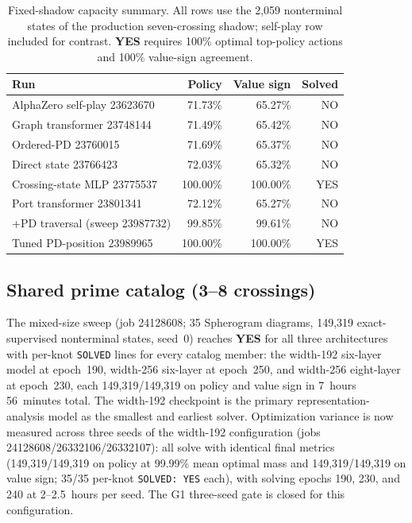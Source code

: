 \begin{table}[h]
\centering
\caption{Fixed-shadow capacity summary. All rows use the 2,059 nonterminal
states of the production seven-crossing shadow; self-play row included for
contrast. \textbf{YES} requires 100\% optimal top-policy actions and 100\%
value-sign agreement.}
\begin{tabular}{lrrr}
\toprule
Run & Policy & Value sign & Solved \\
\midrule
AlphaZero self-play 23623670 & 71.73\% & 65.27\% & NO \\
Graph transformer 23748144 & 71.49\% & 65.42\% & NO \\
Ordered-PD 23760015 & 71.69\% & 65.37\% & NO \\
Direct state 23766423 & 72.03\% & 65.32\% & NO \\
Crossing-state MLP 23775537 & 100.00\% & 100.00\% & YES \\
Port transformer 23801341 & 72.12\% & 65.27\% & NO \\
+PD traversal (sweep 23987732) & 99.85\% & 99.61\% & NO \\
Tuned PD-position 23989965 & 100.00\% & 100.00\% & YES \\
\bottomrule
\end{tabular}
\end{table}

\subsection{Shared prime catalog (3--8 crossings)}
\label{sec:shared}

The mixed-size sweep (job 24128608; 35 Spherogram diagrams, 149,319
exact-supervised nonterminal states, seed~0) reaches \textbf{YES} for all three
architectures with per-knot \texttt{SOLVED} lines for every catalog member: the
width-192 six-layer model at epoch~190, width-256 six-layer at epoch~250, and
width-256 eight-layer at epoch~230, each 149,319/149,319 on policy and value
sign in 7~hours 56~minutes total. The width-192 checkpoint is the primary
representation-analysis model as the smallest and earliest solver. Optimization
variance is now measured across three seeds of the width-192 configuration
(jobs 24128608/26332106/26332107): all solve with identical final metrics
(149,319/149,319 on policy at 99.99\% mean optimal mass and 149,319/149,319 on
value sign; 35/35 per-knot \texttt{SOLVED: YES} each), with solving epochs
190, 230, and 240 at 2--2.5~hours per seed. The G1 three-seed gate is closed
for this configuration.

